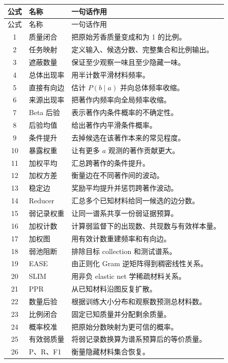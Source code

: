 \documentclass[UTF8,11pt,openany,fontset=none]{ctexbook}
\begin{document}
\begin{longtable}{cp{}p{}}
\toprule
公式 & 名称 & 一句话作用\\
\midrule
\endfirsthead
\toprule
公式 & 名称 & 一句话作用\\
\midrule
\endhead
1 & 质量闭合 & 把原始芳香质量变成和为 1 的比例。\\
2 & 任务映射 & 定义输入、候选分数、完整集合和比例输出。\\
3 & 遮蔽数量 & 保证至少观察一味且至少隐藏一味。\\
4 & 总体出现率 & 用半计数平滑材料频率。\\
5 & 直接有向边 & 估计 $P(b\mid a)$ 并向总体频率收缩。\\
6 & 来源出现率 & 把著作内频率向全局频率收缩。\\
7 & Beta 后验 & 表示著作内条件概率的不确定性。\\
8 & 后验均值 & 给出著作内平滑条件概率。\\
9 & 条件提升 & 去掉候选在该著作本来的常见程度。\\
10 & 暴露权重 & 让有更多 $a$ 观测的著作贡献更大。\\
11 & 加权平均 & 汇总跨著作的条件提升。\\
12 & 加权方差 & 衡量边在不同著作间的波动。\\
13 & 稳定边 & 奖励平均提升并惩罚跨著作波动。\\
14 & Reducer & 汇总多个已知材料给同一候选的边分数。\\
15 & 弱记录权重 & 让同一谱系共享一份弱证据预算。\\
16 & 加权计数 & 计算弱监督下的出现数、共现数与有效样本量。\\
17 & 加权图 & 用有效计数重建频率和有向边。\\
18 & 弱池阻断 & 排除目标 collection 和测试谱系。\\
19 & EASE & 由正则化 Gram 逆矩阵得到稠密线性关系。\\
20 & SLIM & 用非负 elastic net 学稀疏材料关系。\\
21 & PPR & 从已知材料沿图反复扩散。\\
22 & 数量后验 & 根据训练大小分布和观察数预测总材料数。\\
23 & 比例闭合 & 固定已知质量并分配剩余质量。\\
24 & 概率校准 & 把原始分数映射为更可信的概率。\\
25 & 有效弱质量 & 将弱记录数换算为谱系预算后的等价质量。\\
26 & P、R、F1 & 衡量隐藏材料集合恢复。\\

\end{longtable}
\end{document}
